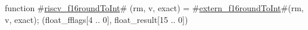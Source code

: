 function #\hyperref[sailRISCVzriscvzyf16roundToInt]{riscv\_f16roundToInt}# (rm, v, exact) = {
  #\hyperref[sailRISCVzexternzyf16roundToInt]{extern\_f16roundToInt}#(rm, v, exact);
  (float_fflags[4 .. 0], float_result[15 .. 0])
}
